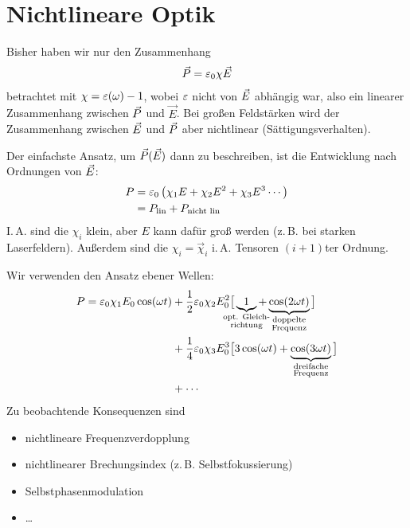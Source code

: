 \chapter{Nichtlineare Optik}

Bisher haben wir nur den Zusammenhang
\begin{gather*}
  \vec{P} = \varepsilon_0\chi\vec{E}
\end{gather*}
betrachtet mit $\chi=\varepsilon(\omega)-1$, wobei $\varepsilon$ nicht von $\vec{E}$
abhängig war, also ein linearer Zusammenhang zwischen $\vec{P} $ und
$\vec E$.
Bei großen Feldstärken wird der Zusammenhang zwischen $\vec{E} $ und
$\vec{P} $ aber nichtlinear (Sättigungsverhalten).

Der einfachste Ansatz, um $\vec{P}(\vec{E})$ dann zu beschreiben, ist die
Entwicklung nach Ordnungen von $\vec{E} $:
\begin{align*}
  P &= \varepsilon_0 \left(
      \chi_1 E + \chi_2 E^2 + \chi_3 E^3 \dotsb
       \right) \\
    &= P_\text{lin} + P_\text{nicht lin}
\end{align*}
I.\,A. sind die $\chi_i$ klein, aber $E$ kann dafür groß werden
(z.\,B. bei starken Laserfeldern).
Außerdem sind die $\chi_i=\vec{\chi}_i$ i.\,A. Tensoren $(i+1)$ter
Ordnung.

Wir verwenden den Ansatz ebener Wellen:
\begin{align*}
  P = \epso \chi_1 E_0\cos(\omega t) 
  &+ \frac{1}{2}\epso\chi_2 E_0^2 \big[ 
  \underbrace{1}_{\mathclap{\substack{\text{opt. Gleich-}\\\text{richtung}}}} +
  \underbrace{\cos(2\omega t)}_{\substack{\text{doppelte}\\ \text{Frequenz}}}
  \big]\\
  &+ \frac{1}{4}\epso\chi_3 E_0^3 \big[
  3\cos(\omega t) + 
  \underbrace{\cos(3\omega t)}_{\substack{\text{dreifache}\\\text{Frequenz}}}
  \big]\\
  &+ \dotsb
\end{align*}
Zu beobachtende Konsequenzen sind
\begin{itemize}
\item nichtlineare Frequenzverdopplung
\item nichtlinearer Brechungsindex (z.\,B. Selbstfokussierung)
\item Selbstphasenmodulation
\item \dots
\end{itemize}



